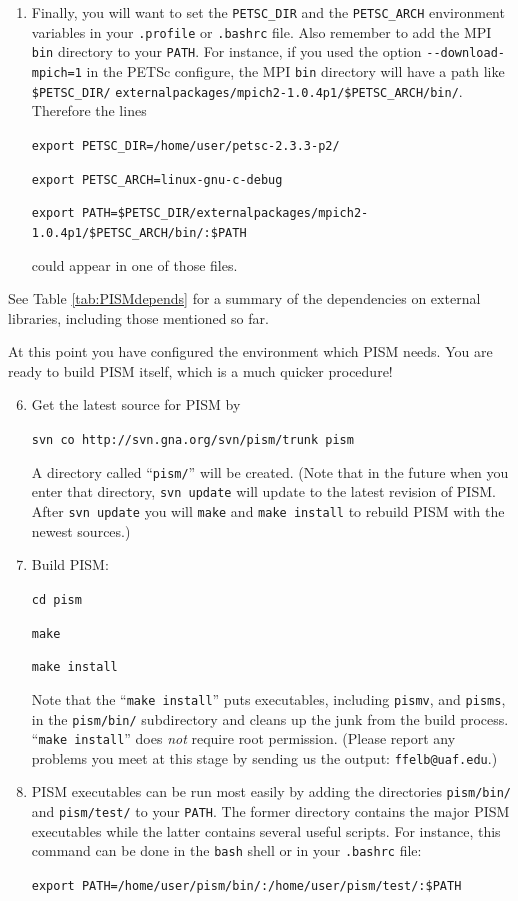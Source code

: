 \documentclass[11pt,final]{amsart}
\begin{document}
\begin{enumerate}
\begin{enumerate}
\item Finally, you will want to set the \verb|PETSC_DIR| and the \verb|PETSC_ARCH| environment variables in your \verb|.profile| or \verb|.bashrc| file.  Also remember to add the MPI \verb|bin| directory to your \verb|PATH|.  For instance, if you used the option \verb|--download-mpich=1| in the PETSc configure, the MPI \verb|bin| directory will have a path like \verb|$PETSC_DIR/| \verb|externalpackages/mpich2-1.0.4p1/$PETSC_ARCH/bin/|.  Therefore the lines 

\small
\verb|export PETSC_DIR=/home/user/petsc-2.3.3-p2/|

\verb|export PETSC_ARCH=linux-gnu-c-debug|

\verb|export PATH=$PETSC_DIR/externalpackages/mpich2-1.0.4p1/$PETSC_ARCH/bin/:$PATH|
\normalsize

\noindent could appear in one of those files.
\end{enumerate}
\end{enumerate}

\bigskip
See Table \ref{tab:PISMdepends} for a summary of the dependencies on external libraries, including those mentioned so far.

\medskip
At this point you have configured the environment which PISM needs.  You are ready to build PISM itself, which is a much quicker procedure!
\bigskip

\begin{enumerate}\setcounter{enumi}{5}
\item \label{getPISMstep} Get the latest source for PISM by

\verb|svn co http://svn.gna.org/svn/pism/trunk pism|

\noindent A directory called ``\verb|pism/|'' will be created.  (Note that in the future when you enter that directory, \verb|svn update| will update to the latest revision of PISM.  After \verb|svn update| you will \verb|make| and \verb|make install| to rebuild PISM with the newest sources.)

\item Build PISM:

\verb|cd pism|

\verb|make|

\verb|make install|

\noindent  Note that the ``\verb|make install|'' puts executables, including \verb|pismv|, and \verb|pisms|, in the \verb|pism/bin/| subdirectory and cleans up the junk from the build process.  ``\verb|make install|'' does \emph{not} require root permission.  (Please report any problems you meet at this stage by sending us the output: \verb|ffelb@uaf.edu|.)

\item PISM executables can be run most easily by adding the directories \verb|pism/bin/| and \verb|pism/test/| to your \verb|PATH|.  The former directory contains the major PISM executables while the latter contains several useful scripts.  For instance, this command can be done in the \verb|bash| shell or in your \verb|.bashrc| file:

\verb|export PATH=/home/user/pism/bin/:/home/user/pism/test/:$PATH|
\end{enumerate}
\end{document}

